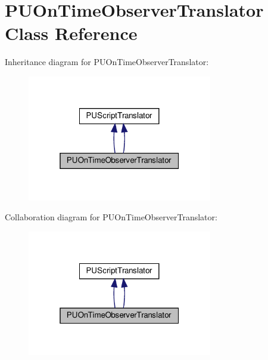 \hypertarget{classPUOnTimeObserverTranslator}{}\section{P\+U\+On\+Time\+Observer\+Translator Class Reference}
\label{classPUOnTimeObserverTranslator}


Inheritance diagram for P\+U\+On\+Time\+Observer\+Translator\+:
\nopagebreak
\begin{figure}[H]
\begin{center}
\leavevmode
\includegraphics[width=229pt]{classPUOnTimeObserverTranslator__inherit__graph}
\end{center}
\end{figure}


Collaboration diagram for P\+U\+On\+Time\+Observer\+Translator\+:
\nopagebreak
\begin{figure}[H]
\begin{center}
\leavevmode
\includegraphics[width=229pt]{classPUOnTimeObserverTranslator__coll__graph}
\end{center}
\end{figure}
